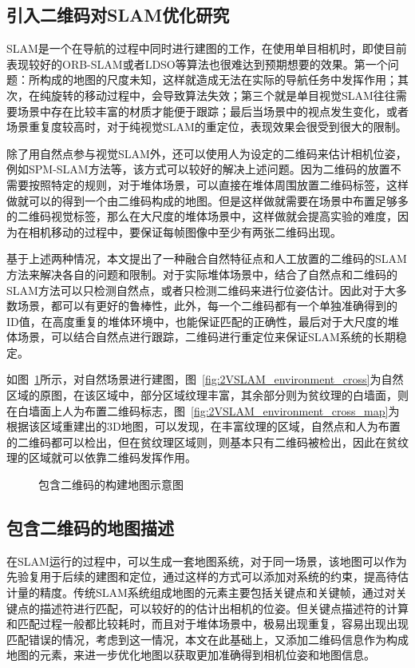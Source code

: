\subsection{引入二维码对SLAM优化研究}
SLAM是一个在导航的过程中同时进行建图的工作，在使用单目相机时，即使目前表现较好的ORB-SLAM或者LDSO等算法也很难达到预期想要的效果。第一个问题：所构成的地图的尺度未知，这样就造成无法在实际的导航任务中发挥作用；其次，在纯旋转的移动过程中，会导致算法失效；第三个就是单目视觉SLAM往往需要场景中存在比较丰富的材质才能便于跟踪；最后当场景中的视点发生变化，或者场景重复度较高时，对于纯视觉SLAM的重定位，表现效果会很受到很大的限制。

除了用自然点参与视觉SLAM外，还可以使用人为设定的二维码来估计相机位姿，例如SPM-SLAM方法等，该方式可以较好的解决上述问题。因为二维码的放置不需要按照特定的规则，对于堆体场景，可以直接在堆体周围放置二维码标签，这样做就可以的得到一个由二维码构成的地图。但是这样做就需要在场景中布置足够多的二维码视觉标签，那么在大尺度的堆体场景中，这样做就会提高实验的难度，因为在相机移动的过程中，要保证每帧图像中至少有两张二维码出现。

基于上述两种情况，本文提出了一种融合自然特征点和人工放置的二维码的SLAM方法来解决各自的问题和限制。对于实际堆体场景中，结合了自然点和二维码的SLAM方法可以只检测自然点，或者只检测二维码来进行位姿估计。因此对于大多数场景，都可以有更好的鲁棒性，此外，每一个二维码都有一个单独准确得到的ID值，在高度重复的堆体环境中，也能保证匹配的正确性，最后对于大尺度的堆体场景，可以结合自然点进行跟踪，二维码进行重定位来保证SLAM系统的长期稳定。

如图~\ref{fig:2VSLAM_environment}所示，对自然场景进行建图，图~\ref{fig:2VSLAM_environment_cross}为自然区域的原图，在该区域中，部分区域纹理丰富，其余部分则为贫纹理的白墙面，则在白墙面上人为布置二维码标志，图~\ref{fig:2VSLAM_environment_cross_map}为根据该区域重建出的3D地图，可以发现，在丰富纹理的区域，自然点和人为布置的二维码都可以检出，但在贫纹理区域则，则基本只有二维码被检出，因此在贫纹理的区域就可以依靠二维码发挥作用。
\begin{figure}[h]
  \centering
  \vskip0.8cm
  \caption{包含二维码的构建地图示意图}
  \label{fig:2VSLAM_environment}
\end{figure}
\subsection{包含二维码的地图描述}
\label{sec:2.3.2}
在SLAM运行的过程中，可以生成一套地图系统，对于同一场景，该地图可以作为先验复用于后续的建图和定位，通过这样的方式可以添加对系统的约束，提高待估计量的精度。传统SLAM系统组成地图的元素主要包括关键点和关键帧，通过对关键点的描述符进行匹配，可以较好的的估计出相机的位姿。但关键点描述符的计算和匹配过程一般都比较耗时，而且对于堆体场景中，极易出现重复，容易出现出现匹配错误的情况，考虑到这一情况，本文在此基础上，又添加二维码信息作为构成地图的元素，来进一步优化地图以获取更加准确得到相机位姿和地图信息。

